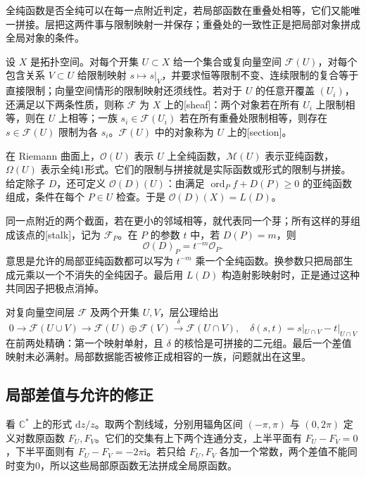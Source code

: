 全纯函数是否全纯可以在每一点附近判定，若局部函数在重叠处相等，它们又能唯一拼接。层把这两件事与限制映射一并保存；重叠处的一致性正是把局部对象拼成全局对象的条件。

\begin{definition}[层与截面]\label{b3:def:A-sheaf}
设 \(X\) 是拓扑空间。对每个开集 \(U\subset X\) 给一个集合或复向量空间 \(\mathcal F(U)\)，对每个包含关系 \(V\subset U\) 给限制映射 \(s\mapsto s|_V\)，并要求恒等限制不变、连续限制的复合等于直接限制；向量空间情形的限制映射还须线性。若对于 \(U\) 的任意开覆盖 \((U_i)\)，还满足以下两条性质，则称 \(\mathcal F\) 为 \(X\) 上的[sheaf]：两个对象若在所有 \(U_i\) 上限制相等，则在 \(U\) 上相等；一族 \(s_i\in\mathcal F(U_i)\) 若在所有重叠处限制相等，则存在 \(s\in\mathcal F(U)\) 限制为各 \(s_i\)。\(\mathcal F(U)\) 中的对象称为 \(U\) 上的[section]。
\end{definition}

在 Riemann 曲面上，\(\mathcal O(U)\) 表示 \(U\) 上全纯函数，\(\mathcal M(U)\) 表示亚纯函数，\(\Omega(U)\) 表示全纯1形式。它们的限制与拼接就是实际函数或形式的限制与拼接。给定除子 \(D\)，还可定义 \(\mathcal O(D)(U)\)：由满足 \(\operatorname{ord}_P f+D(P)\ge0\) 的亚纯函数组成，条件在每个 \(P\in U\) 检查。于是 \(\mathcal O(D)(X)=L(D)\)。

\ProseParagraphBreak
同一点附近的两个截面，若在更小的邻域相等，就代表同一个芽；所有这样的芽组成该点的[stalk]，记为 \(\mathcal F_P\)。在 \(P\) 的参数 \(t\) 中，若 \(D(P)=m\)，则
\[
 \mathcal O(D)_P=t^{-m}\mathcal O_P.
\]
意思是允许的局部亚纯函数都可以写为 \(t^{-m}\) 乘一个全纯函数。换参数只把局部生成元乘以一个不消失的全纯因子。最后用 \(L(D)\) 构造射影映射时，正是通过这种共同因子把极点消掉。

\ProseParagraphBreak
对复向量空间层 \(\mathcal F\) 及两个开集 \(U,V\)，层公理给出
\[
 0\longrightarrow\mathcal F(U\cup V)
 \longrightarrow\mathcal F(U)\oplus\mathcal F(V)
 \xrightarrow{\ \delta\ }\mathcal F(U\cap V),
 \quad \delta(s,t)=s|_{U\cap V}-t|_{U\cap V}
\]
在前两处精确：第一个映射单射，且 \(\delta\) 的核恰是可拼接的二元组。最后一个差值映射未必满射。局部数据能否被修正成相容的一族，问题就出在这里。

\subsection{局部差值与允许的修正}
\label{b3:subsec:A0502}

看 \(\mathbb C^*\) 上的形式 \(\mathrm{d}z/z\)。取两个割线域，分别用辐角区间 \((-\pi,\pi)\) 与 \((0,2\pi)\) 定义对数原函数 \(F_U,F_V\)。它们的交集有上下两个连通分支，上半平面有 \(F_U-F_V=0\)，下半平面则有 \(F_U-F_V=-2\pi\mathrm{i}\)。若只给 \(F_U,F_V\) 各加一个常数，两个差值不能同时变为0，所以这些局部原函数无法拼成全局原函数。

